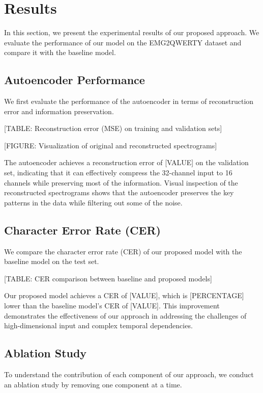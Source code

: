 \section{Results}

In this section, we present the experimental results of our proposed approach. We evaluate the performance of our model on the EMG2QWERTY dataset and compare it with the baseline model.

\subsection{Autoencoder Performance}

We first evaluate the performance of the autoencoder in terms of reconstruction error and information preservation.

[TABLE: Reconstruction error (MSE) on training and validation sets]

[FIGURE: Visualization of original and reconstructed spectrograms]

The autoencoder achieves a reconstruction error of [VALUE] on the validation set, indicating that it can effectively compress the 32-channel input to 16 channels while preserving most of the information. Visual inspection of the reconstructed spectrograms shows that the autoencoder preserves the key patterns in the data while filtering out some of the noise.

\subsection{Character Error Rate (CER)}

We compare the character error rate (CER) of our proposed model with the baseline model on the test set.

[TABLE: CER comparison between baseline and proposed models]

Our proposed model achieves a CER of [VALUE], which is [PERCENTAGE] lower than the baseline model's CER of [VALUE]. This improvement demonstrates the effectiveness of our approach in addressing the challenges of high-dimensional input and complex temporal dependencies.

\subsection{Ablation Study}

To understand the contribution of each component of our approach, we conduct an ablation study by removing one component at a time.

